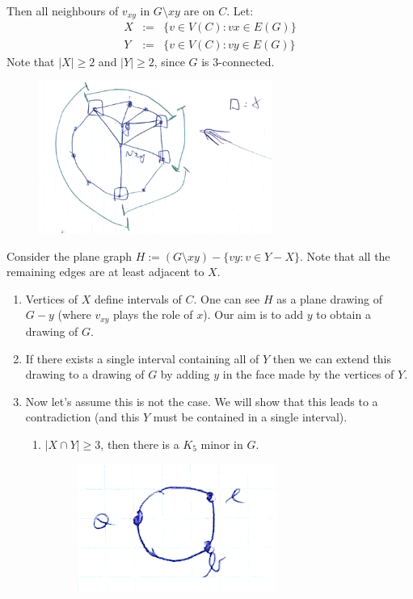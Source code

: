 \begin{enumerate}
\begin{enumerate}
Then all neighbours of $v_{xy}$ in $G \setminus xy$ are on $C$. Let:
						\begin{eqnarray}
							X &:=& \{ v \in V(C) : vx \in E(G)\}\\
							Y &:=& \{ v \in V(C) : vy \in E(G) \}
						\end{eqnarray}
						Note that $|X| \geq 2$ and $|Y| \geq 2$, since $G$ is 3-connected.\\
						\begin{figure}[h]
	\center
	\includegraphics[height=5cm]{img/4-2.png}
\end{figure}

Consider the plane graph $H := (G \setminus xy) - \{ vy : v \in Y -X \}$. Note that all the remaining edges are at least adjacent to $X$.
						\begin{enumerate}
							\item Vertices of $X$ define intervals of $C$. One can see $H$ as a plane drawing of $G - y$ (where $v_{xy}$ plays the role of $x$). Our aim is to add $y$ to obtain a drawing of $G$.
							\item If there exists a single interval containing all of $Y$ then we can extend this drawing to a drawing  of $G$ by adding $y$ in the face made by the vertices of $Y$.
							\item Now let's assume this is not the case. We will show that this leads to a contradiction (and this $Y$ must be contained in a single interval).
								\begin{enumerate}
									\item $|X \cap Y| \geq 3$, then there is a $K_5$ minor in $G$.
									\begin{figure}[h]
	\center
	\includegraphics[width=0.3\linewidth]{img/4-3.png}
\end{figure}


\end{enumerate}
\end{enumerate}
\end{enumerate}
\end{enumerate}
